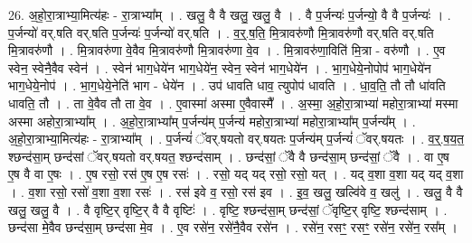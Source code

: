 \documentclass[17pt]{extarticle}
\begin{document}
26. अ॒हो॒रा॒त्राभ्या॒मित्य॑हः - रा॒त्राभ्या᳚म् । . खलु॒ वै वै खलु॒ खलु॒ वै । . वै प॒र्जन्यः॑ प॒र्जन्यो॒ वै वै प॒र्जन्यः॑ । . प॒र्जन्यो॑ वर्.षति वर्.षति प॒र्जन्यः॑ प॒र्जन्यो॑ वर्.षति । . व॒र्॒.ष॒ति॒ मि॒त्रावरु॑णौ मि॒त्रावरु॑णौ वर्.षति वर्.षति मि॒त्रावरु॑णौ । . मि॒त्रावरु॑णा वे॒वैव मि॒त्रावरु॑णौ मि॒त्रावरु॑णा वे॒व । . मि॒त्रावरु॑णा॒विति॑ मि॒त्रा - वरु॑णौ । . ए॒व स्वेन॒ स्वेनै॒वैव स्वेन॑ । . स्वेन॑ भाग॒धेये॑न भाग॒धेये॑न॒ स्वेन॒ स्वेन॑ भाग॒धेये॑न । . भा॒ग॒धेये॒नोपोप॑ भाग॒धेये॑न भाग॒धेये॒नोप॑ । . भा॒ग॒धेये॒नेति॑ भाग - धेये॑न । . उप॑ धावति धाव॒ त्युपोप॑ धावति । . धा॒व॒ति॒ तौ तौ धा॑वति धावति॒ तौ । . ता वे॒वैव तौ ता वे॒व । . ए॒वास्मा॑ अस्मा ए॒वैवास्मै᳚ । . अ॒स्मा॒ अ॒हो॒रा॒त्राभ्या॑ महोरा॒त्राभ्या॑ मस्मा अस्मा अहोरा॒त्राभ्या᳚म् । . अ॒हो॒रा॒त्राभ्या᳚म् प॒र्जन्य॑म् प॒र्जन्य॑ महोरा॒त्राभ्या॑ महोरा॒त्राभ्या᳚म् प॒र्जन्य᳚म् । . अ॒हो॒रा॒त्राभ्या॒मित्य॑हः - रा॒त्राभ्या᳚म् । . प॒र्जन्यं॑ ॅवर्.षयतो वर्.षयतः प॒र्जन्य॑म् प॒र्जन्यं॑ ॅवर्.षयतः । . व॒र्॒.ष॒य॒त॒ श्छन्द॑सा॒म् छन्द॑सां ॅवर्.षयतो वर्.षयत॒ श्छन्द॑साम् । . छन्द॑सां॒ ॅवै वै छन्द॑सा॒म् छन्द॑सां॒ ॅवै । . वा ए॒ष ए॒ष वै वा ए॒षः । . ए॒ष रसो॒ रस॑ ए॒ष ए॒ष रसः॑ । . रसो॒ यद् यद् रसो॒ रसो॒ यत् । . यद् व॒शा व॒शा यद् यद् व॒शा । . व॒शा रसो॒ रसो॑ व॒शा व॒शा रसः॑ । . रस॑ इवे व॒ रसो॒ रस॑ इव । . इ॒व॒ खलु॒ खल्वि॑वे व॒ खलु॑ । . खलु॒ वै वै खलु॒ खलु॒ वै । . वै वृष्टि॒र् वृष्टि॒र् वै वै वृष्टिः॑ । . वृष्टि॒ श्छन्द॑सा॒म् छन्द॑सां॒ ॅवृष्टि॒र् वृष्टि॒ श्छन्द॑साम् । . छन्द॑सा मे॒वैव छन्द॑सा॒म् छन्द॑सा मे॒व । . ए॒व रसे॑न॒ रसे॑नै॒वैव रसे॑न । . रसे॑न॒ रसꣳ॒॒ रसꣳ॒॒ रसे॑न॒ रसे॑न॒ रस᳚म् । \newline
\end{document}
